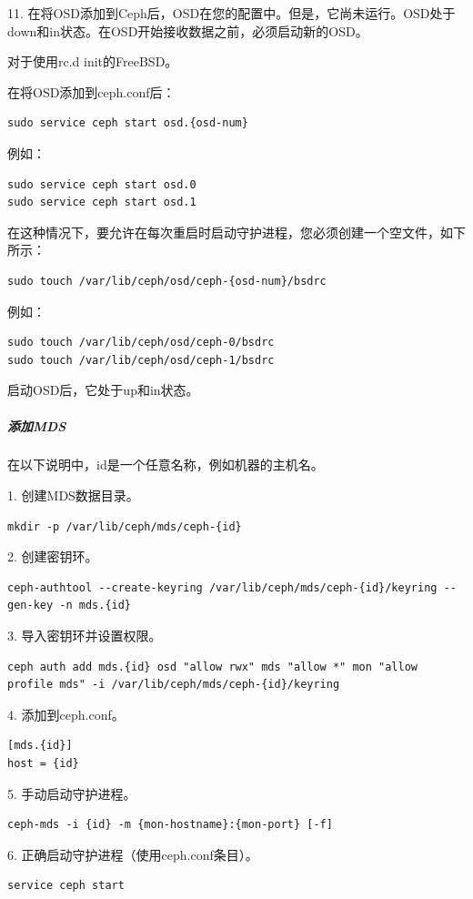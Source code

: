 \documentclass[12pt,UTF8]{ctexbook}
\begin{document}
11. 在将OSD添加到Ceph后，OSD在您的配置中。但是，它尚未运行。OSD处于down和in状态。在OSD开始接收数据之前，必须启动新的OSD。

对于使用rc.d init的FreeBSD。

在将OSD添加到ceph.conf后：
\begin{verbatim}
sudo service ceph start osd.{osd-num}
\end{verbatim}

例如：
\begin{verbatim}
sudo service ceph start osd.0
sudo service ceph start osd.1
\end{verbatim}

在这种情况下，要允许在每次重启时启动守护进程，您必须创建一个空文件，如下所示：
\begin{verbatim}
sudo touch /var/lib/ceph/osd/ceph-{osd-num}/bsdrc
\end{verbatim}

例如：
\begin{verbatim}
sudo touch /var/lib/ceph/osd/ceph-0/bsdrc
sudo touch /var/lib/ceph/osd/ceph-1/bsdrc
\end{verbatim}

启动OSD后，它处于up和in状态。

\subparagraph{添加MDS}
在以下说明中，{id}是一个任意名称，例如机器的主机名。

1. 创建MDS数据目录。
\begin{verbatim}
mkdir -p /var/lib/ceph/mds/ceph-{id}
\end{verbatim}

2. 创建密钥环。
\begin{verbatim}
ceph-authtool --create-keyring /var/lib/ceph/mds/ceph-{id}/keyring --gen-key -n mds.{id}
\end{verbatim}

3. 导入密钥环并设置权限。
\begin{verbatim}
ceph auth add mds.{id} osd "allow rwx" mds "allow *" mon "allow profile mds" -i /var/lib/ceph/mds/ceph-{id}/keyring
\end{verbatim}

4. 添加到ceph.conf。
\begin{verbatim}
[mds.{id}]
host = {id}
\end{verbatim}

5. 手动启动守护进程。
\begin{verbatim}
ceph-mds -i {id} -m {mon-hostname}:{mon-port} [-f]
\end{verbatim}

6. 正确启动守护进程（使用ceph.conf条目）。
\begin{verbatim}
service ceph start
\end{verbatim}
\end{document}
